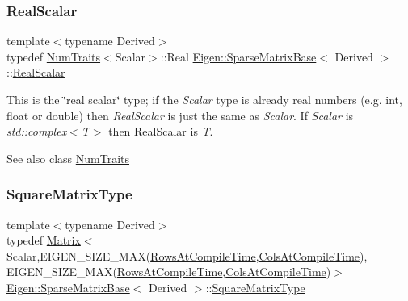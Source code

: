 \subsubsection{\texorpdfstring{RealScalar}{RealScalar}}
{\footnotesize\ttfamily template$<$typename Derived$>$ \\
typedef \mbox{\hyperlink{struct_eigen_1_1_num_traits}{Num\+Traits}}$<$Scalar$>$\+::Real \mbox{\hyperlink{class_eigen_1_1_sparse_matrix_base}{Eigen\+::\+Sparse\+Matrix\+Base}}$<$ Derived $>$\+::\mbox{\hyperlink{class_eigen_1_1_sparse_matrix_base_aaec8ace6efb785c81d442931c3248d88}{Real\+Scalar}}}

This is the \char`\"{}real scalar\char`\"{} type; if the {\itshape Scalar} type is already real numbers (e.\+g. int, float or double) then {\itshape Real\+Scalar} is just the same as {\itshape Scalar}. If {\itshape Scalar} is {\itshape std\+::complex$<$\+T$>$} then Real\+Scalar is {\itshape T}.

\begin{DoxySeeAlso}{See also}
class \mbox{\hyperlink{struct_eigen_1_1_num_traits}{Num\+Traits}} 
\end{DoxySeeAlso}
\mbox{\label{class_eigen_1_1_sparse_matrix_base_aa61bc39f66a93bc46173f3044dacc932}} 
\subsubsection{\texorpdfstring{SquareMatrixType}{SquareMatrixType}}
{\footnotesize\ttfamily template$<$typename Derived$>$ \\
typedef \mbox{\hyperlink{class_eigen_1_1_matrix}{Matrix}}$<$Scalar,E\+I\+G\+E\+N\+\_\+\+S\+I\+Z\+E\+\_\+\+M\+AX(\mbox{\hyperlink{class_eigen_1_1_sparse_matrix_base_a11b30ed44f64a137b4fa1ee638ca2d36a456cda7b9d938e57194036a41d634604}{Rows\+At\+Compile\+Time}},\mbox{\hyperlink{class_eigen_1_1_sparse_matrix_base_a11b30ed44f64a137b4fa1ee638ca2d36a27ba349f075d026c1f51d1ec69aa5b14}{Cols\+At\+Compile\+Time}}), E\+I\+G\+E\+N\+\_\+\+S\+I\+Z\+E\+\_\+\+M\+AX(\mbox{\hyperlink{class_eigen_1_1_sparse_matrix_base_a11b30ed44f64a137b4fa1ee638ca2d36a456cda7b9d938e57194036a41d634604}{Rows\+At\+Compile\+Time}},\mbox{\hyperlink{class_eigen_1_1_sparse_matrix_base_a11b30ed44f64a137b4fa1ee638ca2d36a27ba349f075d026c1f51d1ec69aa5b14}{Cols\+At\+Compile\+Time}})$>$ \mbox{\hyperlink{class_eigen_1_1_sparse_matrix_base}{Eigen\+::\+Sparse\+Matrix\+Base}}$<$ Derived $>$\+::\mbox{\hyperlink{class_eigen_1_1_sparse_matrix_base_aa61bc39f66a93bc46173f3044dacc932}{Square\+Matrix\+Type}}}

